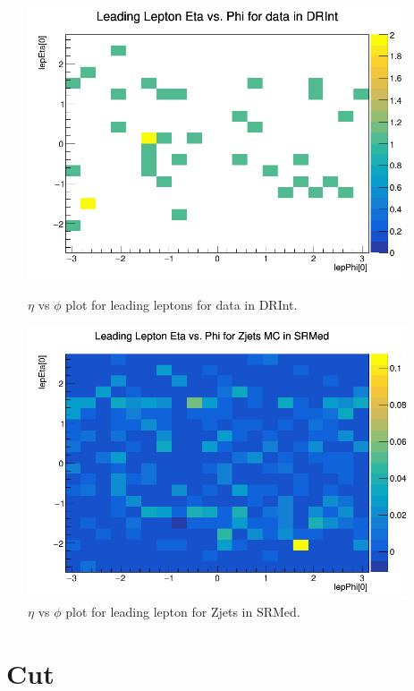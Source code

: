 \begin{figure}[htbp]
\centering
\begin{minipage}{0.45\textwidth}
    \includegraphics[width=\textwidth]{Images/SUSY/lep_eta_phi_data_DRInt.png}
    \caption{$\eta$ vs $\phi$ plot for leading leptons for data in DRInt.}
\end{minipage}
\hfill
\begin{minipage}{0.45\textwidth}
    \includegraphics[width=\textwidth]{Images/SUSY/lep_eta_phi_Zjets_SRMed.png}
    \caption{$\eta$ vs $\phi$ plot for leading lepton for Zjets in SRMed.}
    \label{fig:MC_angle_validation_last}
\end{minipage}
\end{figure}

\section{\ptll\ Cut}

